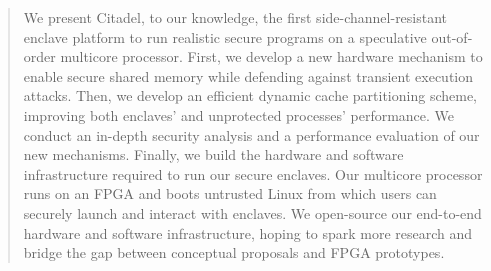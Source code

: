 \begin{abstract}
\vspace{-0.15in}
We present Citadel, to our knowledge, the first side-channel-resistant enclave platform to run realistic secure programs on a speculative out-of-order multicore processor.
First, we develop a new hardware mechanism to enable secure shared memory while defending against transient execution attacks.
Then, we develop an efficient dynamic cache partitioning scheme, improving both enclaves' and unprotected processes' performance.
We conduct an in-depth security analysis and a performance evaluation of our new mechanisms.
Finally, we build the hardware and software infrastructure required to run our secure enclaves.
Our multicore processor runs on an FPGA and boots untrusted Linux from which users can securely launch and interact with enclaves.
We open-source our end-to-end hardware and software infrastructure, hoping to spark more research and bridge the gap between conceptual proposals and FPGA prototypes.
\end{abstract}